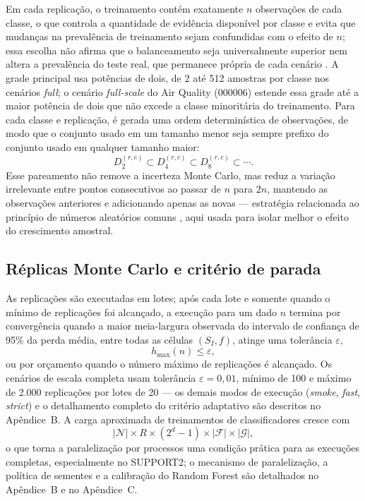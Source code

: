 Em cada replicação, o treinamento contém exatamente $n$ observações de cada classe, o que controla a quantidade de evidência disponível por classe e evita que mudanças na prevalência de treinamento sejam confundidas com o efeito de $n$; essa escolha não afirma que o balanceamento seja universalmente superior nem altera a prevalência do teste real, que permanece própria de cada cenário \cite{He2009}. A grade principal usa potências de dois, de 2 até 512 amostras por classe nos cenários \textit{full}; o cenário \textit{full-scale} do Air Quality (000006) estende essa grade até a maior potência de dois que não excede a classe minoritária do treinamento. Para cada classe e replicação, é gerada uma ordem determinística de observações, de modo que o conjunto usado em um tamanho menor seja sempre prefixo do conjunto usado em qualquer tamanho maior:
\begin{equation}
  D^{(r,c)}_{2}\subset D^{(r,c)}_{4}\subset D^{(r,c)}_{8}\subset\cdots.
  \label{eq:nested-samples}
\end{equation}
Esse pareamento não remove a incerteza Monte Carlo, mas reduz a variação irrelevante entre pontos consecutivos ao passar de $n$ para $2n$, mantendo as observações anteriores e adicionando apenas as novas --- estratégia relacionada ao princípio de números aleatórios comuns \cite{Kahn1953}, aqui usada para isolar melhor o efeito do crescimento amostral.

\subsection{Réplicas Monte Carlo e critério de parada}

As replicações são executadas em lotes; após cada lote e somente quando o mínimo de replicações foi alcançado, a execução para um dado $n$ termina por convergência quando a maior meia-largura observada do intervalo de confiança de 95\% da perda média, entre todas as células $(S_I,f)$, atinge uma tolerância $\varepsilon$,
\begin{equation}
  h_{\max}(n)\leq\varepsilon,
  \label{eq:stopping}
\end{equation}
ou por orçamento quando o número máximo de replicações é alcançado. Os cenários de escala completa usam tolerância $\varepsilon=0{,}01$, mínimo de 100 e máximo de 2.000 replicações por lotes de 20 --- os demais modos de execução (\textit{smoke}, \textit{fast}, \textit{strict}) e o detalhamento completo do critério adaptativo são descritos no Apêndice~B. A carga aproximada de treinamentos de classificadores cresce com
\begin{equation}
  |\mathcal{N}|\times R\times(2^d-1)\times|\mathcal{F}|\times|\mathcal{G}|,
  \label{eq:computational-load}
\end{equation}
o que torna a paralelização por processos uma condição prática para as execuções completas, especialmente no SUPPORT2; o mecanismo de paralelização, a política de sementes e a calibração do Random Forest são detalhados no Apêndice~B e no Apêndice~C.

